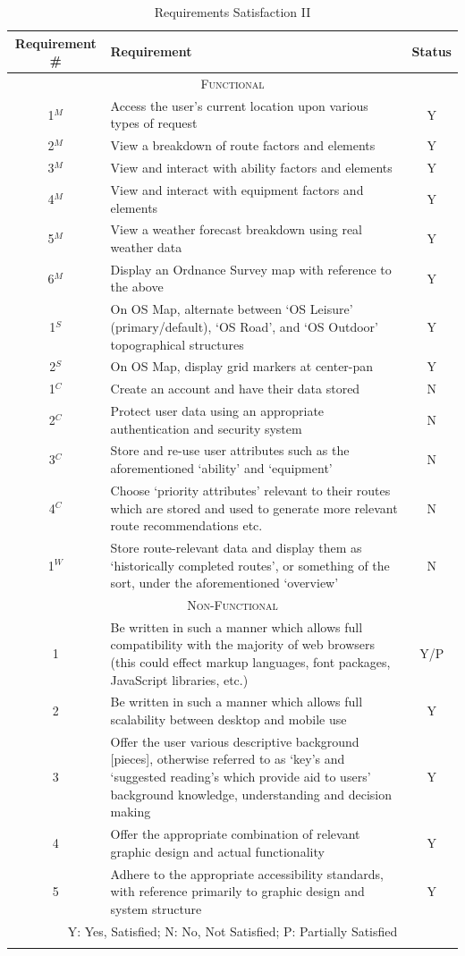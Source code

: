 \documentclass[11pt, english]{article}
\begin{document}
	\begin{center}
		\scriptsize
	\begin{longtable}{cp{10cm}c}
		Requirement \# & Requirement & Status\\
		\hline
		\multicolumn{3}{c}{\textsc{Functional}}\\
		\hline
		1$^M$ & Access the user's current location upon various types of request & Y\\
		2$^M$ & View a breakdown of route factors and elements & Y\\
		3$^M$ & View and interact with ability factors and elements & Y\\
		4$^M$ & View and interact with equipment factors and elements & Y\\
		5$^M$ & View a weather forecast breakdown using real weather data & Y\\
		6$^M$ & Display an Ordnance Survey map with reference to the above & Y\\
		1$^S$ & On OS Map, alternate between `OS Leisure' (primary/default), `OS Road', and `OS Outdoor' topographical structures & Y\\
		2$^S$ & On OS Map, display grid markers at center-pan & Y\\
		1$^C$ & Create an account and have their data stored & N\\
		2$^C$ & Protect user data using an appropriate authentication and security system & N\\
		3$^C$ & Store and re-use user attributes such as the aforementioned `ability' and `equipment' & N\\
		4$^C$ & Choose `priority attributes' relevant to their routes which are stored and used to generate more relevant route recommendations etc. & N\\
		1$^W$ & Store route-relevant data and display them as `historically completed routes', or something of the sort, under the aforementioned `overview' & N\\
		\hline
		\multicolumn{3}{c}{\textsc{Non-Functional}}\\
		\hline
		1 & Be written in such a manner which allows full compatibility with the majority of web browsers (this could effect markup languages, font packages, JavaScript libraries, etc.) & Y/P\\
		2 & Be written in such a manner which allows full scalability between desktop and mobile use & Y\\
		3 & Offer the user various descriptive background [pieces], otherwise referred to as `key's and `suggested reading's which provide aid to users' background knowledge, understanding and decision making & Y\\
		4 & Offer the appropriate combination of relevant graphic design and actual functionality & Y\\
		5 & Adhere to the appropriate accessibility standards, with reference primarily to graphic design and system structure & Y\\
		\hline
		\multicolumn{3}{p{12cm}}{Y: Yes, Satisfied; N: No, Not Satisfied; P: Partially Satisfied}\\
		\hline
		\caption{Requirements Satisfaction II}
	\end{longtable}
	\end{center}
\end{document}

